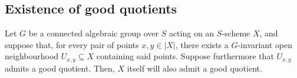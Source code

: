     \subsection{Existence of good quotients}
        \begin{proposition}
            Let $G$ be a connected algebraic group over $S$ acting on an $S$-scheme $X$, and suppose that, for every pair of points $x, y \in |X|$, there exists a $G$-invariant open neighbourhood $U_{x, y} \subseteq X$ containing said points. Suppose furthermore that $U_{x, y}$ admits a good quotient. Then, $X$ itself will also admit a good quotient.
        \end{proposition}